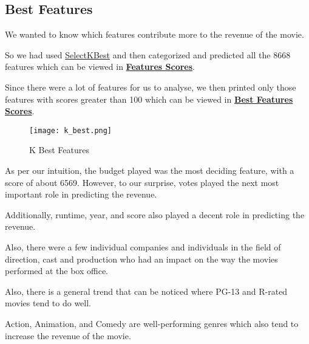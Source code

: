 \documentclass[conference]{IEEEtran}
\begin{document}
        \subsection{Best Features}
            We wanted to know which features contribute more to the revenue of the movie.
            
            So we had used \href{https://scikit-learn.org/stable/modules/generated/sklearn.feature_selection.SelectKBest.html}{SelectKBest} and then categorized and predicted all the 8668 features which can be viewed in \href{https://github.com/Vikranth3140/Movie-Revenue-Prediction/blob/main/Helper%20files/Best%20Festures/feature_scores.txt}{\textbf{Features Scores}}.
            
            Since there were a lot of features for us to analyse, we then printed only those features with scores greater than 100 which can be viewed in \href{https://github.com/Vikranth3140/Movie-Revenue-Prediction/blob/main/Helper%20files/Best%20Festures/significant_features.txt}{\textbf{Best Features Scores}}.
            
            \begin{figure}[h]
                \centering
                \texttt{[image: k\_best.png]}
                \caption{K Best Features}
                \label{fig:k-best}
            \end{figure}
            
            As per our intuition, the budget played was the most deciding feature, with a score of about 6569.
            However, to our surprise, votes played the next most important role in predicting the revenue.
            
            Additionally, runtime, year, and score also played a decent role in predicting the revenue.
            
            Also, there were a few individual companies and individuals in the field of direction, cast and production who had an impact on the way the movies performed at the box office.
            
            Also, there is a general trend that can be noticed where PG-13 and R-rated movies tend to do well.
            
            Action, Animation, and Comedy are well-performing genres which also tend to increase the revenue of the movie.
\end{document}
